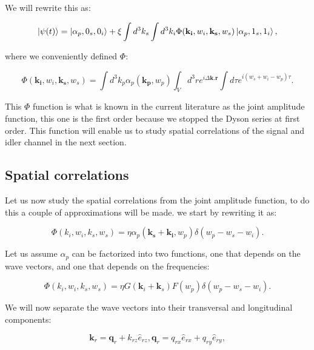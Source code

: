 \documentclass[12pt]{article}
\begin{document}
We will rewrite this as:

\begin{equation}
\ket{\psi(t)}=\ket{\alpha_{p},0_{s},0_{i}}+\xi \int d^{3}k_{s}\int d^{3}k_{i}
\Phi(\mathbf{k_{i}},w_{i},\mathbf{k_{s}},w_{s})\ket{\alpha_{p},1_{s},1_{i}},
\end{equation}

where we conveniently defined $\Phi$:

\begin{equation}
\Phi(\mathbf{k_{i}},w_{i},\mathbf{k_{s}},w_{s})=\int d^{3}k_{p} \alpha_{p}(\mathbf{k_{p}},w_{p}) \int_{V} d^{3}r e^{i \Delta \mathbf{k}.\mathbf{r}} \int d\tau e^{i(w_{s}+w_{i}-w_{p})\tau}.
\end{equation}

This $\Phi$ function is what is known in the current literature as the joint amplitude function, this one is the first order because we stopped the Dyson series at first order. This function will enable us to study spatial correlations of the signal and idler channel in the next section.

\subsection{Spatial correlations}

Let us now study the spatial correlations from the joint amplitude function, to do this a couple of approximations will be made. we start by rewriting it as:

\begin{equation}
\Phi(k_{i},w_{i},k_{s},w_{s})= \eta \alpha_{p}(\mathbf{k_{s}}+\mathbf{k_{i}},w_{p}) \delta(w_{p}-w_{s}-w_{i}).
\end{equation}


Let us assume  $\alpha_{p}$ can be factorized into two functions, one that depends on the wave vectors, and one that depends on the frequencies:

\begin{equation}
\Phi(k_{i},w_{i},k_{s},w_{s})= \eta G(\mathbf{k}_{i}+\mathbf{k}_{s}) F(w_{p}) \delta(w_{p}-w_{s}-w_{i}).
\end{equation}
  
We  will now separate the wave vectors into their transversal and longitudinal components:

\begin{equation}
\mathbf{k}_{r}=\mathbf{q}_{r}+k_{rz} \hat{e}_{rz},\mathbf{q}_{r}=q_{rx} \hat{e}_{rx}+q_{ry} \hat{e}_{ry},
\end{equation}
\end{document}
